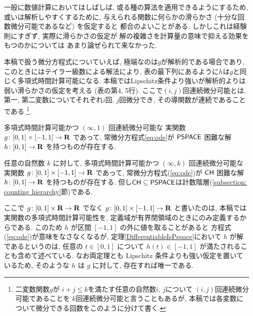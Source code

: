 一般に数値計算においてはしばしば, 
或る種の算法を適用できるようにするため, 
或いは解析しやすくするために, 
与えられる関数に何らかの滑らかさ (十分な回数微分可能であるなど) を仮定すると
都合のよいことがある. 
しかしこれは経験則にすぎず, 
実際に滑らかさの仮定が
解の複雑さを計算量の意味で抑える効果をもつのかについては
あまり論ぜられて来なかった. 

本稿で扱う微分方程式についていえば, 
極端なのは$g$が解析的である場合であり, 
このときにはテイラー級数による解法により, 
表の最下列にあるように$h$は$g$と同じく多項式時間計算可能になる. 
本稿ではLipschitz条件より強いが解析的よりは弱い滑らかさの仮定を考える
(表の第4, 5行). 
ここで$(i, j)$回連続微分可能とは, 
第一, 第二変数についてそれぞれ$i$回, $j$回微分でき, 
その導関数が連続であることである
\footnote{%
二変数関数$g$が
$i+j \le k$を満たす任意の自然数$i$, $j$について
$(i,j)$回連続微分可能であることを
$k$回連続微分可能と言うこともあるが, 
本稿では各変数について微分できる回数をこのように分けて書く.}.

 \begin{theorem}
  \label{DifferentiableIsPspace}
  多項式時間計算可能かつ $(\infty, 1)$ 回連続微分可能な
  実関数 $g \colon [0,1] \times [-1,1] \to \mathbf R$ であって, 
  常微分方程式\eqref{eq:ode}が
  $\mathsf{PSPACE}$ 困難な解 $h \colon [0, 1] \to \mathbf R$ を持つものが存在する.
 \end{theorem}

 \begin{theorem}
  \label{KTimesIsCH}
  任意の自然数 $k$ に対して, 
  多項式時間計算可能かつ $(\infty, k)$ 回連続微分可能な
  実関数 $g \colon [0,1] \times [-1,1] \to \mathbf R$ であって, 
  常微分方程式(\ref{eq:ode})が
  $\mathsf{CH}$ 困難な解 $h \colon [0, 1] \to \mathbf R$ を持つものが存在する.
但し$\mathsf{CH} \subseteq \mathsf{PSPACE}$は計数階層(\ref{subsection: counting hierarchy}節)である.
 \end{theorem}

ここで $g \colon [0,1] \times \mathbf R \to \mathbf R$ でなく
$g \colon [0,1] \times [-1, 1] \to \mathbf R$ と書いたのは, 
本稿では実関数の多項式時間計算可能性を, 
定義域が有界閉領域のときにのみ定義するからである. 
このため $h$ が区間 $[-1, 1]$ の外に値を取ることがあると
方程式(\ref{eq:ode})が意味をなさなくなるが, 
定理\ref{DifferentiableIsPspace}において $h$ が解であるというのは, 
任意の $t \in [0, 1]$ について $h (t) \in [-1, 1]$ が満たされることも含めて述べている.
なお両定理とも Lipschitz 条件よりも強い仮定を置いているため, 
そのような $h$ は $g$ に対して, 存在すれば唯一である. 

